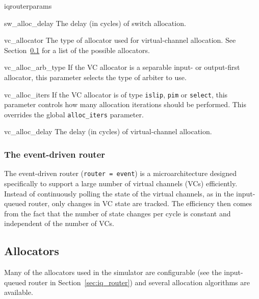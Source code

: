 \documentclass[11pt]{article}
\begin{document}
\begin{opt_list}{iqrouterparams}
\item[sw\_alloc\_delay] The delay (in cycles) of switch allocation.

\item[vc\_allocator] The type of allocator used for virtual-channel
allocation.  See Section~\ref{sec:alloc} for a list of the possible
allocators.

\item[vc\_alloc\_arb\_type] If the VC allocator is a separable input- or output-first allocator, this parameter selects the type of arbiter to use.

\item[vc\_alloc\_iters] If the VC allocator is of type \texttt{islip}, \texttt{pim} or \texttt{select}, this parameter controls how many allocation iterations should be performed. This overrides the global \texttt{alloc\_iters} parameter.

\item[vc\_alloc\_delay] The delay (in cycles) of virtual-channel
allocation.

\end{opt_list}

\subsubsection{The event-driven router}
\label{sec:event_router}

The event-driven router (\texttt{router = event}) is a
microarchitecture designed specifically to support a large number of
virtual channels (VCs) efficiently.  Instead of continuously polling
the state of the virtual channels, as in the input-queued router, only
changes in VC state are tracked.  The efficiency then comes from the
fact that the number of state changes per cycle is constant and
independent of the number of VCs.

\subsection{Allocators}
\label{sec:alloc}

Many of the allocators used in the simulator are configurable (see
the input-queued router in Section~\ref{sec:iq_router}) and several
allocation algorithms are available.
\end{document}
